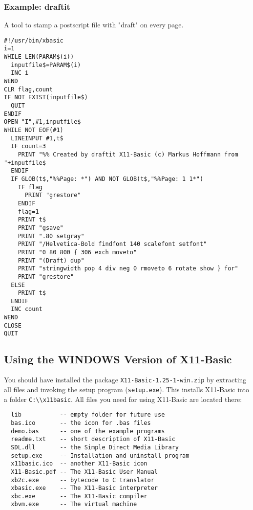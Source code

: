 \begin{mdframed}[hidealllines=true,backgroundcolor=blue!20]
\subsubsection*{Example: draftit} A tool to stamp a postscript file
with "draft" on every page.
{\footnotesize
\begin{verbatim}
#!/usr/bin/xbasic
i=1
WHILE LEN(PARAM$(i))
  inputfile$=PARAM$(i)
  INC i
WEND
CLR flag,count
IF NOT EXIST(inputfile$)
  QUIT
ENDIF  
OPEN "I",#1,inputfile$
WHILE NOT EOF(#1)
  LINEINPUT #1,t$
  IF count=3
    PRINT "%% Created by draftit X11-Basic (c) Markus Hoffmann from "+inputfile$
  ENDIF
  IF GLOB(t$,"%%Page: *") AND NOT GLOB(t$,"%%Page: 1 1*")
    IF flag
      PRINT "grestore"
    ENDIF
    flag=1
    PRINT t$
    PRINT "gsave"
    PRINT ".80 setgray"
    PRINT "/Helvetica-Bold findfont 140 scalefont setfont"
    PRINT "0 80 800 { 306 exch moveto"
    PRINT "(Draft) dup"
    PRINT "stringwidth pop 4 div neg 0 rmoveto 6 rotate show } for"
    PRINT "grestore"
  ELSE 
    PRINT t$
  ENDIF
  INC count
WEND
CLOSE
QUIT
\end{verbatim}
}
\end{mdframed}

\subsection{Using the WINDOWS Version of X11-Basic}

You should have installed the package \verb|X11-Basic-1.25-1-win.zip| by 
extracting all files and invoking the  setup program (\verb|setup.exe|). This
installs X11-Basic into a folder  \verb|C:\\x11basic|.  All files you need for
using X11-Basic are located there:

\begin{verbatim}
  lib           -- empty folder for future use
  bas.ico       -- the icon for .bas files
  demo.bas      -- one of the example programs
  readme.txt    -- short description of X11-Basic
  SDL.dll       -- the Simple Direct Media Library
  setup.exe     -- Installation and uninstall program
  x11basic.ico  -- another X11-Basic icon
  X11-Basic.pdf -- The X11-Basic User Manual
  xb2c.exe      -- bytecode to C translator
  xbasic.exe    -- The X11-Basic interpreter
  xbc.exe       -- The X11-Basic compiler
  xbvm.exe      -- The virtual machine
\end{verbatim}

